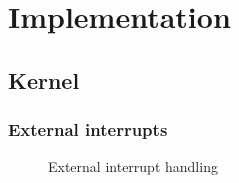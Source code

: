 \chapter{Implementation}




\section{Kernel}





\subsection{External interrupts}\label{subsec:external-ints}
\begin{figure}[h]
	\centering
	
	\caption{External interrupt handling}
	\label{fig:external-interrupt}
\end{figure}





